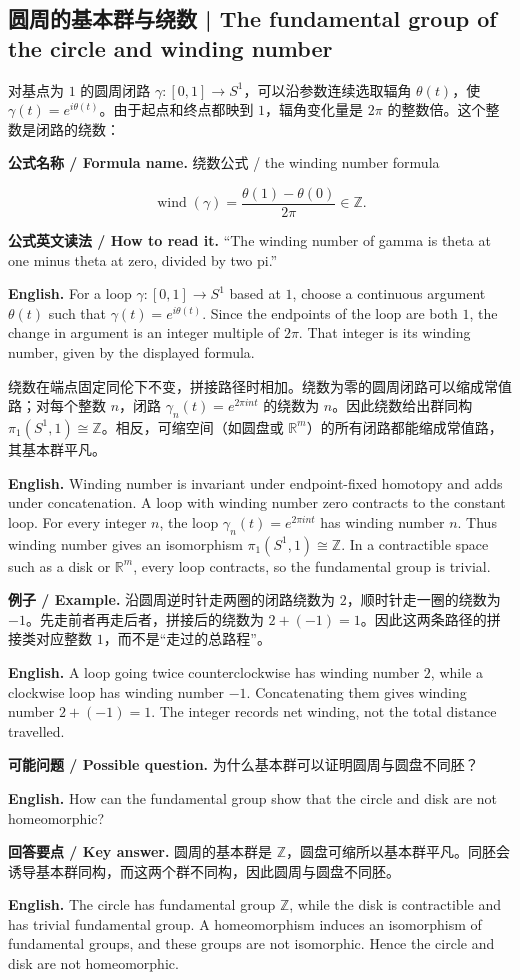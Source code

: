 \documentclass[UTF8,11pt,a4paper]{ctexart}
\newcommand{\EN}[1]{\par\noindent\textbf{English.} #1\par}
\newcommand{\READ}[1]{\par\noindent\textbf{公式英文读法 / How to read it.} #1\par}
\newcommand{\FORMULA}[2]{\par\noindent\textbf{公式名称 / Formula name.} #1 / #2\par}
\newcommand{\EX}[2]{\par\noindent\textbf{例子 / Example.} #1\par\EN{#2}}
\newcommand{\ASK}[4]{\par\noindent\textbf{可能问题 / Possible question.} #1\par\EN{#2}\noindent\textbf{回答要点 / Key answer.} #3\par\EN{#4}\medskip}
\begin{document}
\subsection{圆周的基本群与绕数 | The fundamental group of the circle and winding number}
\noindent 对基点为 $1$ 的圆周闭路 $\gamma:[0,1]\to S^1$，可以沿参数连续选取辐角 $\theta(t)$，使 $\gamma(t)=e^{i\theta(t)}$。由于起点和终点都映到 $1$，辐角变化量是 $2\pi$ 的整数倍。这个整数是闭路的绕数：
\FORMULA{绕数公式}{the winding number formula}
\[
\operatorname{wind}(\gamma)=\frac{\theta(1)-\theta(0)}{2\pi}\in\mathbb Z.
\]
\READ{“The winding number of gamma is theta at one minus theta at zero, divided by two pi.”}
\EN{For a loop $\gamma:[0,1]\to S^1$ based at $1$, choose a continuous argument $\theta(t)$ such that $\gamma(t)=e^{i\theta(t)}$. Since the endpoints of the loop are both $1$, the change in argument is an integer multiple of $2\pi$. That integer is its winding number, given by the displayed formula.}
\noindent 绕数在端点固定同伦下不变，拼接路径时相加。绕数为零的圆周闭路可以缩成常值路；对每个整数 $n$，闭路 $\gamma_n(t)=e^{2\pi int}$ 的绕数为 $n$。因此绕数给出群同构 $\pi_1(S^1,1)\cong\mathbb Z$。相反，可缩空间（如圆盘或 $\mathbb R^m$）的所有闭路都能缩成常值路，其基本群平凡。
\EN{Winding number is invariant under endpoint-fixed homotopy and adds under concatenation. A loop with winding number zero contracts to the constant loop. For every integer $n$, the loop $\gamma_n(t)=e^{2\pi int}$ has winding number $n$. Thus winding number gives an isomorphism $\pi_1(S^1,1)\cong\mathbb Z$. In a contractible space such as a disk or $\mathbb R^m$, every loop contracts, so the fundamental group is trivial.}
\EX{沿圆周逆时针走两圈的闭路绕数为 $2$，顺时针走一圈的绕数为 $-1$。先走前者再走后者，拼接后的绕数为 $2+(-1)=1$。因此这两条路径的拼接类对应整数 $1$，而不是“走过的总路程”。}{A loop going twice counterclockwise has winding number $2$, while a clockwise loop has winding number $-1$. Concatenating them gives winding number $2+(-1)=1$. The integer records net winding, not the total distance travelled.}
\ASK{为什么基本群可以证明圆周与圆盘不同胚？}{How can the fundamental group show that the circle and disk are not homeomorphic?}{圆周的基本群是 $\mathbb Z$，圆盘可缩所以基本群平凡。同胚会诱导基本群同构，而这两个群不同构，因此圆周与圆盘不同胚。}{The circle has fundamental group $\mathbb Z$, while the disk is contractible and has trivial fundamental group. A homeomorphism induces an isomorphism of fundamental groups, and these groups are not isomorphic. Hence the circle and disk are not homeomorphic.}
\end{document}
